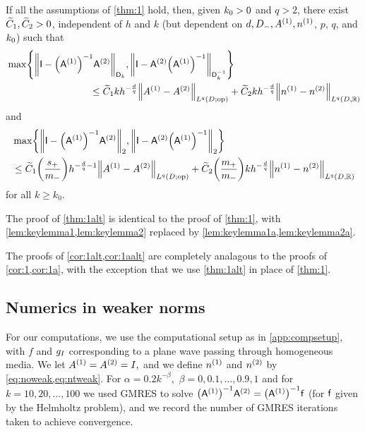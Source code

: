 \begin{theorem}\label{thm:1alt}
If all the assumptions of  \ref{thm:1} hold, then, given $k_{0}>0$ and $q >2$, there exist $\widetilde{C}_{1}, \widetilde{C}_{2}>0$, independent of $h$ and $k$ (but dependent on $d, D_{-}, {A}^{(1)}, {n}^{(1)}$, $p$, $q$, and $k_{0}$) such that
\begin{align}\nonumber
&\max\set{\NDk{\Imat - \AmatoI\Amatt},\NDkI{\Imat -\Amatt\AmatoI}}\\
&\hspace{3cm} 
\leq \Cotilde kh^{-\frac{d}q} \NLqDop{\Aso-\Ast} + \Cttilde  kh^{-\frac{d}q}  \NLqDRR{\nso-\nst}
\label{eq:main1alt}
\end{align}
and 
\begin{align}\nonumber
&\max\set{\Nt{\Imat - \AmatoI\Amatt}, \Nt{\Imat -\Amatt\AmatoI}}\\
&\hspace{0cm}
\leq \Cotilde \mleft(\frac{\splus}{\mminus}\mright) h^{-\frac{d}q-1}\NLqDop{\Aso-\Ast} + \Cttilde \mleft(\frac{\mplus}{\mminus}\mright) kh^{-\frac{d}q}\NLqDRR{\nso-\nst}
\label{eq:main1aalt}
\end{align}
for all $k\geq k_0$. 
\end{theorem}

The proof of \cref{thm:1alt} is identical to the proof of \cref{thm:1}, with \cref{lem:keylemma1,lem:keylemma2} replaced by \cref{lem:keylemma1a,lem:keylemma2a}.


\label{page:cor1altcor1aaltproof}
The proofs of \cref{cor:1alt,cor:1aalt} are completely analagous to the proofs of \cref{cor:1,cor:1a}, with the exception that we use \cref{thm:1alt} in place of \cref{thm:1}.
\epf


\subsection{Numerics in weaker norms}\label{sec:weakernumerics}
For our computations, we use the computational setup as in \cref{app:compsetup}, with $f$ and $g_{I}$ corresponding to a plane wave passing through homogeneous media.  We let ${A}^{(1)}={A}^{(2)}=I,$ and we define ${n}^{(1)}$ and ${n}^{(2)}$ by \cref{eq:noweak,eq:ntweak}. For $\alpha = 0.2k^{-\beta},$ $\beta = 0,0.1,\ldots,0.9,1$ and for $k=10,20,\ldots,100$ we used GMRES to solve $\AmatoI\Amatt = \AmatoI \fvec$ (for $\mathsf{f}$ given by the Helmholtz problem), and we record the number of GMRES iterations taken to achieve convergence.

